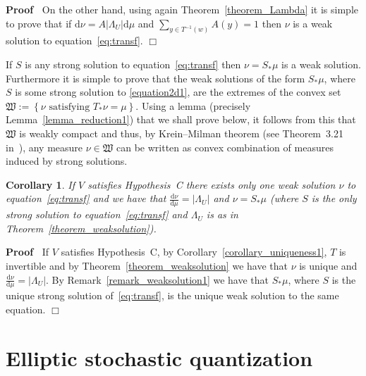\documentclass[a4paper,10pt]{article}
\newcommand{\assign}{:=}
\newcommand{\asterisk}{\mathord{*}}
\newcommand{\mathd}{\mathrm{d}}
\newenvironment{proof}{\noindent\textbf{Proof\ }}{\hspace*{\fill}$\Box$\medskip}
\newtheorem{corollary}[theorem]{Corollary}
\begin{document}
\begin{proof}
  On the other hand, using again Theorem~\ref{theorem_Lambda} it is simple to
  prove that if $\mathd \nu = A | \Lambda_U | \mathd \mu$ and $\sum_{y \in
  T^{- 1} (w)} A (y) = 1$ then $\nu$ is a weak solution to
  equation~{\eqref{eq:transf}}.
\end{proof}

\begin{remark}
  \label{remark_weaksolution1}If $S$ is any strong solution to
  equation~{\eqref{eq:transf}} then $\nu = S_{\asterisk} \mu$ is a weak
  solution. Furthermore it is simple to prove that the weak solutions of the
  form $S_{\asterisk} \mu$, where $S$ is some strong solution to
  {\eqref{equation2d1}}, are the extremes of the convex set $\mathfrak{W}
  \assign \left\{ \text{$\nu$ satisfying $T_{\asterisk} \nu = \mu$} \right\}$.
  Using a lemma (precisely Lemma~\ref{lemma_reduction1}) that we shall prove
  below, it follows from this that $\mathfrak{W}$ is weakly compact and thus,
  by Krein--Milman theorem (see Theorem~3.21 in~{\cite{Rudin1973}}), any
  measure $\nu \in \mathfrak{W}$ can be written as convex combination of
  measures induced by strong solutions. \ 
\end{remark}

\begin{corollary}
  \label{corollary_uniqueness2}If $V$ satisfies Hypothesis~C there exists only
  one weak solution $\nu$ to equation~{\eqref{eq:transf}} and we have that
  $\frac{\mathd \nu}{\mathd \mu} = | \Lambda_U |$ and $\nu = S_{\asterisk}
  \mu$ (where $S$ is the only strong solution to equation~{\eqref{eq:transf}}
  and $\Lambda_U$ is as in Theorem~\ref{theorem_weaksolution}).
\end{corollary}

\begin{proof}
  If $V$ satisfies Hypothesis~C, by Corollary~\ref{corollary_uniqueness1}, $T$
  is invertible and by Theorem~\ref{theorem_weaksolution} we have that $\nu$
  is unique and $\frac{\mathd \nu}{\mathd \mu} = | \Lambda_U | .$ By
  Remark~\ref{remark_weaksolution1} we have that $S_{\asterisk} \mu$, where
  $S$ is the unique strong solution of~{\eqref{eq:transf}}, is the unique weak
  solution to the same equation.
\end{proof}

\section{Elliptic stochastic quantization}\label{sec:dim-red}
\end{document}
